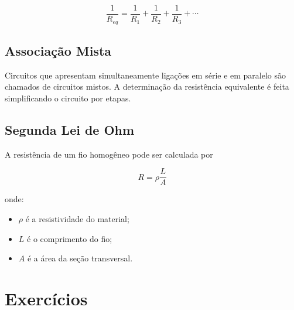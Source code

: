 \documentclass[12pt,a4paper]{article}
\begin{document}
\[
\frac{1}{R_{eq}}
=
\frac{1}{R_1}
+
\frac{1}{R_2}
+
\frac{1}{R_3}
+\cdots
\]

\subsection*{Associação Mista}

Circuitos que apresentam simultaneamente ligações em série e em paralelo são chamados de circuitos mistos. A determinação da resistência equivalente é feita simplificando o circuito por etapas.

\subsection*{Segunda Lei de Ohm}

A resistência de um fio homogêneo pode ser calculada por

\[
R=\rho\frac{L}{A}
\]

onde:

\begin{itemize}
\item $\rho$ é a resistividade do material;
\item $L$ é o comprimento do fio;
\item $A$ é a área da seção transversal.
\end{itemize}

\newpage

\section*{Exercícios}
\end{document}
